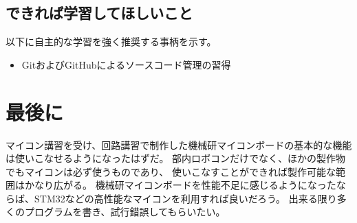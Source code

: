 \documentclass[uplatex]{jsarticle}
\begin{document}
\subsection{できれば学習してほしいこと}
以下に自主的な学習を強く推奨する事柄を示す。
\begin{itemize}
    \item GitおよびGitHubによるソースコード管理の習得
\end{itemize}

\section{最後に}
マイコン講習を受け、回路講習で制作した機械研マイコンボードの基本的な機能は使いこなせるようになったはずだ。
部内ロボコンだけでなく、ほかの製作物でもマイコンは必ず使うものであり、
使いこなすことができれば製作可能な範囲はかなり広がる。
機械研マイコンボードを性能不足に感じるようになったならば、STM32などの高性能なマイコンを利用すれば良いだろう。
出来る限り多くのプログラムを書き、試行錯誤してもらいたい。
\end{document}
